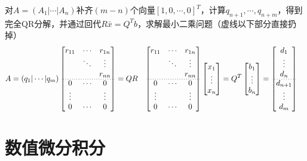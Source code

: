 \documentclass[twocolumn]{article}
\begin{document}
\newpage
对$A=(A_1|\cdots|A_n)$补齐$(m-n)$个向量$[1,0,\cdots,0]^T$，计算$q_{n+1},\cdots,q_{n+m}$，得到完全QR分解，并通过回代$R\bar{x}=Q^Tb$，求解最小二乘问题（虚线以下部分直接扔掉）
\begin{align*}
    A=(q_1|\cdots|q_m)
    \begin{bmatrix}
        r_{11} & \cdots & r_{1n} \\
               & \ddots & \vdots \\
               &        & r_{nn} \\
        \cdashline{1-3}[0.8pt/2pt]
        0      & \cdots & 0      \\
        \vdots &        & \vdots \\
        0      & \cdots & 0
    \end{bmatrix}
     & =QR
     &
    \begin{bmatrix}
        r_{11} & \cdots & r_{1n} \\
               & \ddots & \vdots \\
               &        & r_{nn} \\
        \cdashline{1-3}[0.8pt/2pt]
        0      & \cdots & 0      \\
        \vdots &        & \vdots \\
        0      & \cdots & 0
    \end{bmatrix}
    \begin{bmatrix}
        x_1    \\
        \vdots \\
        x_n
    \end{bmatrix}
     & =Q^T
    \begin{bmatrix}
        b_1    \\
        \vdots \\
        b_n
    \end{bmatrix}
    =
    \begin{bmatrix}
        d_1     \\
        \vdots  \\
        d_n     \\
        \cdashline{1-1}[0.8pt/2pt]
        d_{n+1} \\
        \vdots  \\
        d_m
    \end{bmatrix}
\end{align*}

\section{数值微分积分}
\end{document}
